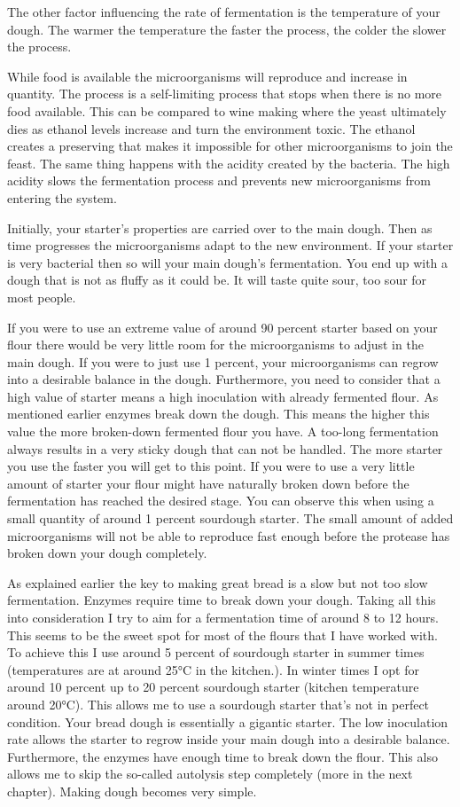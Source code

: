 The other factor influencing the rate of fermentation is the temperature of
your dough. The warmer the temperature the faster the process, the colder the
slower the process.

While food is available the microorganisms will reproduce and increase in
quantity. The process is a self-limiting process that stops when there is no
more food available. This can be compared to wine making where
the yeast ultimately dies as ethanol levels increase and turn the environment
toxic. The ethanol creates a preserving that makes it impossible for other
microorganisms to join the feast. The same thing happens with the acidity
created by the bacteria. The high acidity slows the fermentation process and
prevents new microorganisms from entering the system.

Initially, your starter's properties are carried over to the main dough. Then
as time progresses the microorganisms adapt to the new environment. If your
starter is very bacterial then so will your main dough's fermentation. You
end up with a dough that is not as fluffy as it could be. It will taste quite
sour, too sour for most people.

If you were to use an extreme value of around 90 percent starter based on your flour there
would be very little room for the microorganisms to adjust in the main dough.
If you were to just use 1 percent, your microorganisms can regrow into a
desirable balance in the dough. Furthermore, you need to consider that a high value
of starter means a high inoculation with already fermented flour. As
mentioned earlier enzymes break down the dough. This means the higher this
value the more broken-down fermented flour you have. A too-long fermentation
always results in a very sticky dough that can not be handled. The more
starter you use the faster you will get to this point. If you were to use a
very little amount of starter your flour might have naturally broken down
before the fermentation has reached the desired stage. You can observe this
when using a small quantity of around 1 percent sourdough starter. The small
amount of added microorganisms will not be able to reproduce fast enough
before the protease has broken down your dough completely.

As explained earlier the key to making great bread is a slow but not too slow
fermentation. Enzymes require time to break down your dough. Taking all this
into consideration I try to aim for a fermentation time of around 8 to 12 hours. This seems to be
the sweet spot for most of the flours that I have worked with. To achieve this
I use around 5 percent of sourdough starter in summer times (temperatures are
at around 25°C in the kitchen.). In winter times I opt for around 10 percent
up to 20 percent sourdough starter (kitchen temperature around 20°C). This
allows me to use a sourdough starter that's not in perfect condition. Your
bread dough is essentially a gigantic starter. The low inoculation rate allows
the starter to regrow inside your main dough into a desirable balance.
Furthermore, the enzymes have enough time to break down the flour. This also
allows me to skip the so-called autolysis step completely (more in the next chapter).
 Making dough becomes very simple.

